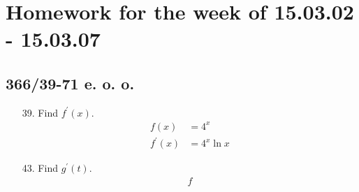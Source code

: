 \documentclass[11pt]{article}
\begin{document}
\section{Homework for the week of 15.03.02 - 15.03.07}
\subsection{366/39-71 e. o. o.}
\begin{enumerate}
	\item[39.] Find $f^\prime(x)$.
	\begin{align*}
		f(x) &= 4^x\\
		f^\prime (x) &= 4^x\ln x
	\end{align*}
	\item[43.] Find $g^\prime (t)$.
	\begin{align*}
		f
	\end{align*}
\end{enumerate}
\end{document}
